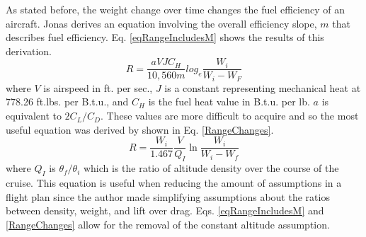 As stated before, the weight change over time changes the fuel efficiency of an aircraft. Jonas \cite{Jonas} derives an equation involving the overall efficiency slope, $m$ that describes fuel efficiency. Eq. \ref{eqRangeIncludesM} shows the results of this derivation.
\begin{equation}
    R = \dfrac{aVJC_H}{10,560m}log_e\dfrac{W_i}{W_i-W_F}
    \label{eqRangeIncludesM}
\end{equation}
where $V$ is airspeed in ft. per sec., $J$ is a constant representing mechanical heat at 778.26 ft.lbs. per B.t.u., and $C_H$ is the fuel heat value in B.t.u. per lb. $a$ is equivalent to $2C_L/C_D$. These values are more difficult to acquire and so the most useful equation was derived by \cite{Jonas} shown in Eq. \ref{RangeChanges}.
\begin{equation}
    R = \dfrac{W_i}{1.467}\dfrac{V}{Q_I}\ln\dfrac{W_i}{W_i-W_f}
    \label{RangeChanges}
\end{equation}
where $Q_I$ is $\theta_f/\theta_i$ which is the ratio of altitude density over the course of the cruise. This equation is useful when reducing the amount of assumptions in a flight plan since the author made simplifying assumptions about the ratios between density, weight, and lift over drag. Eqs. \ref{eqRangeIncludesM} and \ref{RangeChanges} allow for the removal of the constant altitude assumption.\par
